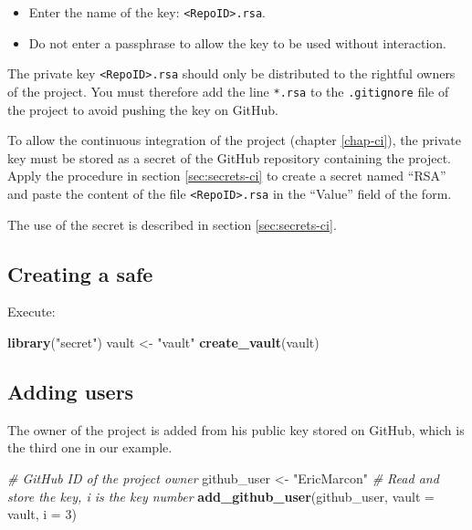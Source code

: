 \documentclass[
  12pt,
  american,
  a4paper,
  extrafontsizes,onecolumn,openright
  ]{memoir}
\newenvironment{Shaded}{\begin{snugshade}}{\end{snugshade}}
\newcommand{\AttributeTok}[1]{\textcolor[rgb]{0.13,0.29,0.53}{#1}}
\newcommand{\CommentTok}[1]{\textcolor[rgb]{0.56,0.35,0.01}{\textit{#1}}}
\newcommand{\DecValTok}[1]{\textcolor[rgb]{0.00,0.00,0.81}{#1}}
\newcommand{\FunctionTok}[1]{\textcolor[rgb]{0.13,0.29,0.53}{\textbf{#1}}}
\newcommand{\NormalTok}[1]{#1}
\newcommand{\OtherTok}[1]{\textcolor[rgb]{0.56,0.35,0.01}{#1}}
\newcommand{\StringTok}[1]{\textcolor[rgb]{0.31,0.60,0.02}{#1}}
\providecommand{\tightlist}{%
  \setlength{\itemsep}{0pt}\setlength{\parskip}{0pt}}
\begin{document}
\begin{itemize}
\tightlist
\item
  Enter the name of the key: \texttt{\textless{}RepoID\textgreater{}.rsa}.
\item
  Do not enter a passphrase to allow the key to be used without interaction.
\end{itemize}

The private key \texttt{\textless{}RepoID\textgreater{}.rsa} should only be distributed to the rightful owners of the project.
You must therefore add the line \texttt{*.rsa} to the \texttt{.gitignore} file of the project to avoid pushing the key on GitHub.

To allow the continuous integration of the project (chapter \ref{chap-ci}), the private key must be stored as a secret of the GitHub repository containing the project.
Apply the procedure in section \ref{sec:secrets-ci} to create a secret named \enquote{RSA} and paste the content of the file \texttt{\textless{}RepoID\textgreater{}.rsa} in the \enquote{Value} field of the form.

The use of the secret is described in section \ref{sec:secrets-ci}.

\subsection{Creating a safe}\label{creating-a-safe}

Execute:

\scriptsize

\begin{Shaded}
\begin{Highlighting}[]
\FunctionTok{library}\NormalTok{(}\StringTok{"secret"}\NormalTok{)}
\NormalTok{vault }\OtherTok{\textless{}{-}} \StringTok{"vault"}
\FunctionTok{create\_vault}\NormalTok{(vault)}
\end{Highlighting}
\end{Shaded}

\normalsize

\subsection{Adding users}\label{adding-users}

The owner of the project is added from his public key stored on GitHub, which is the third one in our example.

\scriptsize

\begin{Shaded}
\begin{Highlighting}[]
\CommentTok{\# GitHub ID of the project owner}
\NormalTok{github\_user }\OtherTok{\textless{}{-}} \StringTok{"EricMarcon"}
\CommentTok{\# Read and store the key, i is the key number}
\FunctionTok{add\_github\_user}\NormalTok{(github\_user, }\AttributeTok{vault =}\NormalTok{ vault, }\AttributeTok{i =} \DecValTok{3}\NormalTok{)}
\end{Highlighting}
\end{Shaded}
\end{document}
